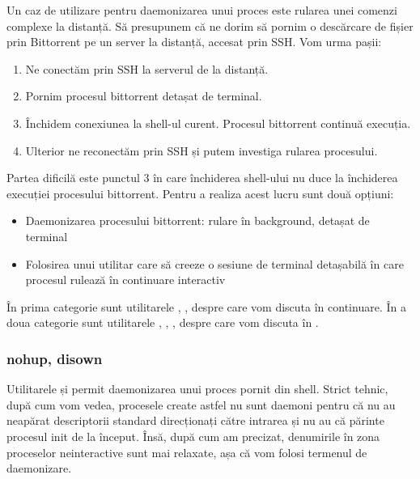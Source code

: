 Un caz de utilizare pentru daemonizarea unui proces este rularea unei comenzi
complexe la distanță. Să presupunem că ne dorim să pornim o descărcare de fișier
prin Bittorrent pe un server la distanță, accesat prin SSH. Vom urma pașii:

\begin{enumerate}
	\item Ne conectăm prin SSH la serverul de la distanță.
	\item Pornim procesul bittorrent detașat de terminal.
	\item Închidem conexiunea la shell-ul curent. Procesul bittorrent
		continuă execuția.
	\item Ulterior ne reconectăm prin SSH și putem investiga rularea
		procesului.
\end{enumerate}

Partea dificilă este punctul 3 în care închiderea shell-ului nu duce la
închiderea execuției procesului bittorrent. Pentru a realiza acest lucru sunt
două opțiuni:

\begin{itemize}
	\item Daemonizarea procesului bittorrent: rulare în background, detașat
		de terminal
	\item Folosirea unui utilitar care să creeze o sesiune de terminal
		detașabilă în care procesul rulează în continuare interactiv
\end{itemize}

În prima categorie sunt utilitarele , , despre care vom discuta în
continuare. În a doua categorie sunt utilitarele , , , 
despre care vom discuta în
.

\subsubsection{nohup, disown}
\label{sec:procese-interactivitate-detasare-nohup}

Utilitarele  și  permit daemonizarea unui proces pornit din shell.
Strict tehnic, după cum vom vedea, procesele create astfel nu sunt daemoni pentru că nu
au neapărat descriptorii standard direcționați către intrarea  și nu au
că părinte procesul init de la început. Însă, după cum am precizat, denumirile
în zona proceselor neinteractive sunt mai relaxate, așa că vom folosi termenul
de daemonizare.

